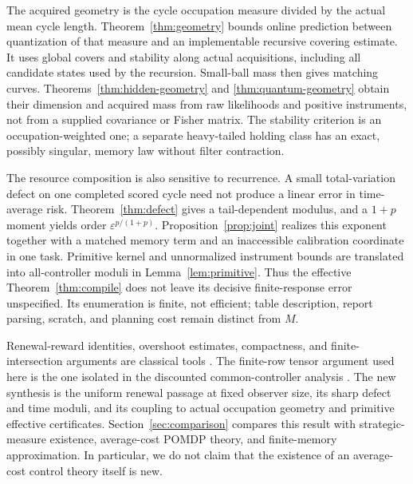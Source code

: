 The acquired geometry is the cycle occupation measure divided by the actual mean cycle length. Theorem~\ref{thm:geometry} bounds online prediction between quantization of that measure and an implementable recursive covering estimate. It uses global covers and stability along actual acquisitions, including all candidate states used by the recursion. Small-ball mass then gives matching curves. Theorems~\ref{thm:hidden-geometry} and \ref{thm:quantum-geometry} obtain their dimension and acquired mass from raw likelihoods and positive instruments, not from a supplied covariance or Fisher matrix. The stability criterion is an occupation-weighted one; a separate heavy-tailed holding class has an exact, possibly singular, memory law without filter contraction.

The resource composition is also sensitive to recurrence. A small total-variation defect on one completed scored cycle need not produce a linear error in time-average risk. Theorem~\ref{thm:defect} gives a tail-dependent modulus, and a $1+p$ moment yields order $\varepsilon^{p/(1+p)}$. Proposition~\ref{prop:joint} realizes this exponent together with a matched memory term and an inaccessible calibration coordinate in one task. Primitive kernel and unnormalized instrument bounds are translated into all-controller moduli in Lemma~\ref{lem:primitive}. Thus the effective Theorem~\ref{thm:compile} does not leave its decisive finite-response error unspecified. Its enumeration is finite, not efficient; table description, report parsing, scratch, and planning cost remain distinct from $M$.

Renewal-reward identities, overshoot estimates, compactness, and finite-intersection arguments are classical tools \cite{Asmussen,Lorden,Kallenberg}. The finite-row tensor argument used here is the one isolated in the discounted common-controller analysis \cite{Discounted}. The new synthesis is the uniform renewal passage at fixed observer size, its sharp defect and time moduli, and its coupling to actual occupation geometry and primitive effective certificates. Section~\ref{sec:comparison} compares this result with strategic-measure existence, average-cost POMDP theory, and finite-memory approximation. In particular, we do not claim that the existence of an average-cost control theory itself is new.
